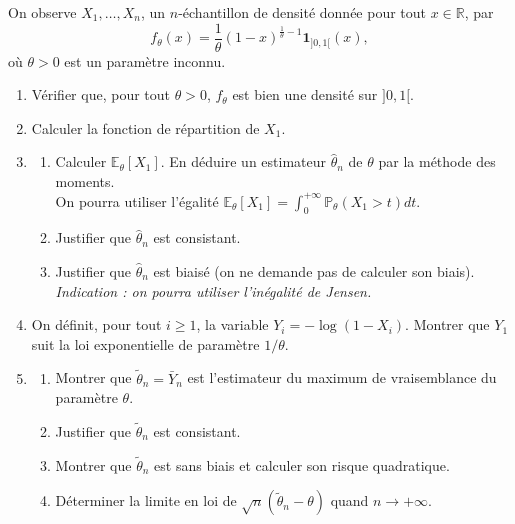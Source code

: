 \begin{mdframed}
\begin{exercice}
On observe $X_1, \dots, X_n$, un $n$-échantillon de densité donnée pour tout $x \in \mathbb{R}$, par
\begin{equation*}
f_\theta(x) = \frac{1}{\theta}(1 - x)^{\frac{1}{\theta} - 1} \mathbf{1}_{]0, 1[}(x),
\end{equation*}
où $\theta > 0$ est un paramètre inconnu.

\begin{enumerate}
    \item Vérifier que, pour tout $\theta > 0$, $f_\theta$ est bien une densité sur $]0, 1[$.
    \item Calculer la fonction de répartition de $X_1$.
    \item 
    \begin{enumerate}
        \item[i--] Calculer $\mathbb{E}_\theta[X_1]$. En déduire un estimateur $\hat{\theta}_n$ de $\theta$ par la méthode des moments.\\
        On pourra utiliser l'égalité $\mathbb{E}_\theta[X_1] = \int_0^{+\infty} \mathbb{P}_\theta(X_1 > t)dt$.
        \item[ii--] Justifier que $\hat{\theta}_n$ est consistant.
        \item[iii--] Justifier que $\hat{\theta}_n$ est biaisé (on ne demande pas de calculer son biais).\\
        \textit{Indication : on pourra utiliser l'inégalité de Jensen.}
    \end{enumerate}
    \item On définit, pour tout $i \ge 1$, la variable $Y_i = -\log(1 - X_i)$. Montrer que $Y_1$ suit la loi exponentielle de paramètre $1/\theta$.
    \item 
    \begin{enumerate}
        \item[i--] Montrer que $\tilde{\theta}_n = \bar{Y}_n$ est l'estimateur du maximum de vraisemblance du paramètre $\theta$.
        \item[ii--] Justifier que $\tilde{\theta}_n$ est consistant.
        \item[iii--] Montrer que $\tilde{\theta}_n$ est sans biais et calculer son risque quadratique.
        \item[iv--] Déterminer la limite en loi de $\sqrt{n}(\tilde{\theta}_n - \theta)$ quand $n \to +\infty$.
    \end{enumerate}
\end{enumerate}
\end{exercice}
\end{mdframed}